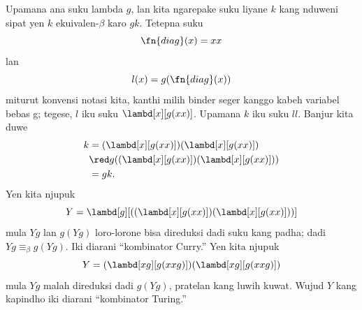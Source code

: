 \documentclass[../../../include/open-logic-section]{subfiles}
\begin{document}

Upamana ana suku lambda $g$, lan kita
ngarepake suku liyane $k$ kang nduweni
sipat yen $k$ ekuivalen-$\beta$ karo
$gk$. Tetepna suku
\[
\fn{diag}(x) = xx
\]
lan
\[
l(x) = g(\fn{diag}(x))
\]
miturut konvensi notasi kita, kanthi milih binder seger kanggo kabeh variabel bebas g; tegese,
$l$ iku suku $\lambd[x][g(xx)]$.
Upamana $k$ iku suku $ll$. Banjur
kita duwe
\begin{align*}
k & = (\lambd[x][g(xx)])(\lambd[x][g(xx)]) \\
& \red  g((\lambd[x][g(xx)])(\lambd[x][g(xx)])) \\
& = gk.
\end{align*}
Yen kita njupuk
\[
Y = \lambd[g][((\lambd[x][g(xx)])(\lambd[x][g(xx)]))]
\]
mula $Yg$ lan $g(Yg)$ loro-lorone bisa
direduksi dadi suku kang padha; dadi
$Yg \equiv_\beta
g(Yg)$. Iki diarani ``kombinator Curry.''
Yen kita njupuk
\[
Y = (\lambd[xg][g(xxg)])(\lambd[xg][g(xxg)])
\]
mula $Yg$ malah direduksi dadi
$g(Yg)$, pratelan kang luwih kuwat.
Wujud $Y$ kang kapindho iki diarani
``kombinator Turing.''
\end{document}
